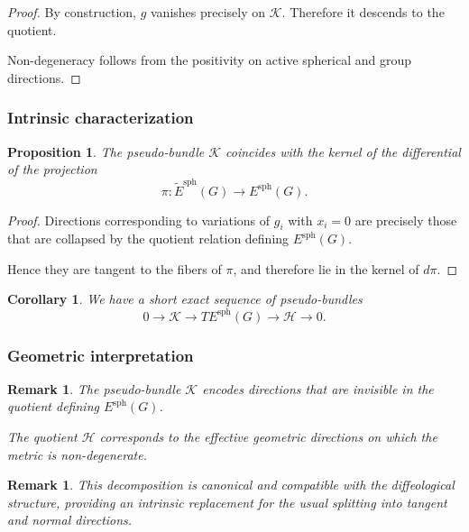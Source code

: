 \documentclass[11pt]{amsart}
\newtheorem{corollary}[theorem]{Corollary}
\newtheorem{proposition}[theorem]{Proposition}
\newtheorem{remark}[theorem]{Remark}
\begin{document}
\begin{proof}
By construction, $g$ vanishes precisely on $\mathcal{K}$. Therefore it descends to the quotient.

Non-degeneracy follows from the positivity on active spherical and group directions.
\end{proof}

\subsubsection{Intrinsic characterization}

\begin{proposition}
The pseudo-bundle $\mathcal{K}$ coincides with the kernel of the differential of the projection
\[
\pi : \widetilde E^{\mathrm{sph}}(G) \to E^{\mathrm{sph}}(G).
\]
\end{proposition}

\begin{proof}
Directions corresponding to variations of $g_i$ with $x_i=0$ are precisely those that are collapsed by the quotient relation defining $E^{\mathrm{sph}}(G)$.

Hence they are tangent to the fibers of $\pi$, and therefore lie in the kernel of $d\pi$.
\end{proof}

\begin{corollary}
We have a short exact sequence of pseudo-bundles
\[
0 \longrightarrow \mathcal{K}
\longrightarrow T E^{\mathrm{sph}}(G)
\longrightarrow \mathcal{H}
\longrightarrow 0.
\]
\end{corollary}

\subsubsection{Geometric interpretation}

\begin{remark}
The pseudo-bundle $\mathcal{K}$ encodes directions that are invisible in the quotient defining $E^{\mathrm{sph}}(G)$.

The quotient $\mathcal{H}$ corresponds to the effective geometric directions on which the metric is non-degenerate.
\end{remark}

\begin{remark}
This decomposition is canonical and compatible with the diffeological structure, providing an intrinsic replacement for the usual splitting into tangent and normal directions.
\end{remark}
\end{document}
